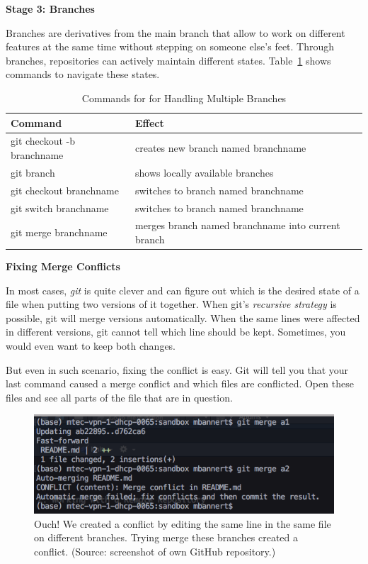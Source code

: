 \documentclass[
  12pt,
  letterpaper,
]{krantz}
\begin{document}
\textbf{Stage 3: Branches}

Branches are derivatives from the main branch that allow to work on
different features at the same time without stepping on someone else's
feet. Through branches, repositories can actively maintain different
states. Table~\ref{tbl-gitbranches} shows commands
to navigate these states.

\hypertarget{tbl-gitbranches}{}
\begin{table}
\caption{\label{tbl-gitbranches}Commands for for Handling Multiple Branches }\tabularnewline

\centering
\begin{tabular}{>{\raggedright\arraybackslash}p{5.7cm}>{\raggedright\arraybackslash}p{5.7cm}}
\toprule
Command & Effect\\
\midrule
git checkout -b branchname & creates new branch named branchname\\
git branch & shows locally available branches\\
git checkout branchname & switches to branch named branchname\\
git switch branchname & switches to branch named branchname\\
git merge branchname & merges branch named branchname into current branch\\
\bottomrule
\end{tabular}
\end{table}

\textbf{Fixing Merge Conflicts}

In most cases, \emph{git} is quite
clever and can figure out which is the desired state of a file when
putting two versions of it together. When git's \emph{recursive
strategy} is possible, git will merge versions automatically. When the
same lines were affected in different versions, git cannot tell which
line should be kept. Sometimes, you would even want to keep both
changes.

But even in such scenario, fixing the conflict is easy. Git will tell
you that your last command caused a merge conflict and which files are
conflicted. Open these files and see all parts of the file that are in
question.

\begin{figure}

{\centering \includegraphics{./images/merge_conflict.png}

}

\caption{Ouch! We created a conflict by editing the same line in the
same file on different branches. Trying merge these branches created a
conflict. (Source: screenshot of own GitHub repository.)}

\end{figure}
\end{document}

